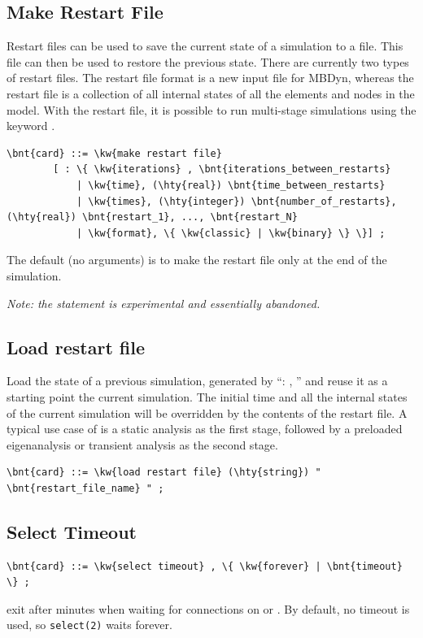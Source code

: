 \subsection{Make Restart File}
Restart files can be used to save the current state of a simulation to a file.
This file can then be used to restore the previous state. There are currently two types of restart files.
The  restart file format is a new input file for MBDyn, whereas the  restart file is a collection
of all internal states of all the elements and nodes in the model. With the  restart file, it is possible
to run multi-stage simulations using the keyword .
\begin{Verbatim}[commandchars=\\\{\}]
    \bnt{card} ::= \kw{make restart file}
        [ : \{ \kw{iterations} , \bnt{iterations_between_restarts}
            | \kw{time}, (\hty{real}) \bnt{time_between_restarts} 
            | \kw{times}, (\hty{integer}) \bnt{number_of_restarts}, (\hty{real}) \bnt{restart_1}, ..., \bnt{restart_N}
            | \kw{format}, \{ \kw{classic} | \kw{binary} \} \}] ;        
\end{Verbatim}
The default (no arguments) is to make the  restart file only at the end of
the simulation.

\emph{Note: the  statement is experimental and essentially abandoned.}

\subsection{Load restart file}
Load the state of a previous simulation, generated by ``: , ''
and reuse it as a starting point the current simulation. The initial time and all the internal states
of the current simulation will be overridden by the contents of the restart file. A typical use case of
 is a static analysis as the first stage, followed by a preloaded eigenanalysis
or transient analysis as the second stage.
\begin{Verbatim}[commandchars=\\\{\}]
    \bnt{card} ::= \kw{load restart file} (\hty{string}) " \bnt{restart_file_name} " ;        
\end{Verbatim}

\subsection{Select Timeout}
\begin{Verbatim}[commandchars=\\\{\}]
    \bnt{card} ::= \kw{select timeout} , \{ \kw{forever} | \bnt{timeout} \} ;
\end{Verbatim}
exit after  minutes when waiting for connections 
on  or .
By default, no timeout is used, so \texttt{select(2)} waits forever.

